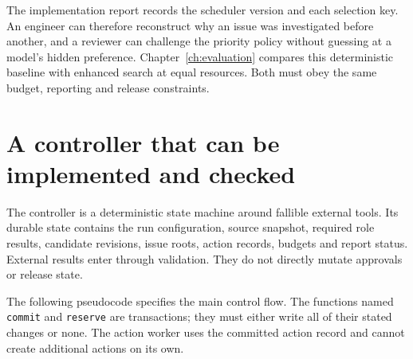 \documentclass[12pt,a4paper,oneside,openany]{book}
\begin{document}
The implementation report records the scheduler version and each selection key.
An engineer can therefore reconstruct why an issue was investigated before
another, and a reviewer can challenge the priority policy without guessing at a
model's hidden preference. Chapter~\ref{ch:evaluation} compares this deterministic
baseline with enhanced search at equal resources. Both must obey the same budget,
reporting and release constraints.

\section{A controller that can be implemented and checked}
\label{merge:M06:15}


The controller is a deterministic state machine around fallible external tools.
Its durable state contains the run configuration, source snapshot, required role
results, candidate revisions, issue roots, action records, budgets and report
status. External results enter through validation. They do not directly mutate
approvals or release state.

The following pseudocode specifies the main control flow. The functions named
\texttt{commit} and \texttt{reserve} are transactions; they must either write all
of their stated changes or none. The action worker uses the committed action
record and cannot create additional actions on its own.
\end{document}
